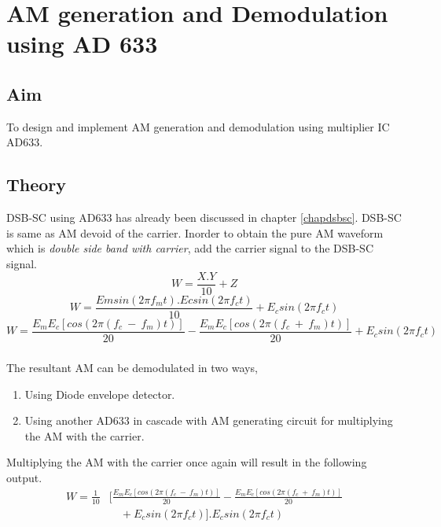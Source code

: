 
\chapter[AM generation and Demodulation using AD 633]{AM generation and Demodulation using AD 633}
\section*{Aim}
To design and implement AM generation and demodulation using multiplier IC AD633.
\section*{Theory}
DSB-SC using AD633 has already been discussed in chapter \ref{chapdsbsc}. DSB-SC is same as AM devoid of the carrier. Inorder to obtain the pure AM waveform which is \emph{double side band with carrier}, add the carrier signal to the DSB-SC signal.
\begin{equation}
W= \frac{X.Y}{10}+Z
\end{equation}
\begin{equation}
W= \frac{Emsin(2\pi f_mt).Ecsin(2\pi f_ct)}{10}+E_c sin(2\pi f_ct)
\end{equation}
\begin{equation}
W= \frac{E_mE_c [cos (2\pi (f_c\ -\ f_m)t)]}{20}- \frac{E_mE_c[cos (2\pi (f_c\ +\ f_m)t)]}{20}+E_c sin(2\pi f_ct)
\end{equation}

\paragraph{}
	The resultant AM can be demodulated in two ways,
 \begin{enumerate}

\item
Using Diode envelope detector.
\item
Using another AD633 in cascade with AM generating circuit for multiplying the AM with the carrier.
\end{enumerate}

Multiplying the AM with the carrier once again will result in the following output.
\begin{equation}
\begin{split}
W=\frac{1}{10} &[ \frac{E_mE_c [cos (2\pi (f_c\ -\ f_m)t)]}{20}- \frac{E_mE_c[cos (2\pi (f_c\ +\ f_m)t)]}{20}\\
&\quad +E_c sin(2\pi f_ct)].E_c sin(2\pi f_ct)
\end{split}
\end{equation}

